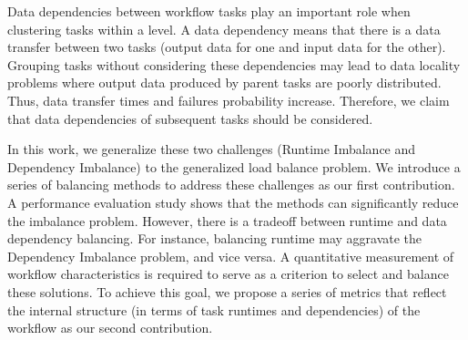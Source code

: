 \documentclass[final]{IEEEtran}
\begin{document}
Data dependencies between workflow tasks play an important role when clustering tasks within a level. A data dependency means that there is a data transfer between two tasks (output data for one and input data for the other). Grouping tasks without considering these dependencies may lead to data locality problems where output data produced by parent tasks are poorly distributed. Thus, data transfer times and failures probability increase.
Therefore, we claim that data dependencies of subsequent tasks should be considered.



In this work, we generalize these two challenges (Runtime Imbalance and Dependency Imbalance) to the generalized load balance problem. We introduce a series of balancing methods to address these challenges as our first contribution. A performance evaluation study shows that the methods can significantly reduce the imbalance problem.
However, there is a tradeoff between runtime and data dependency balancing. For instance, 
balancing runtime may aggravate the Dependency Imbalance problem, and vice versa. A quantitative measurement of workflow characteristics is required to serve as a criterion to select and balance these solutions. To achieve this goal, we propose a series of metrics that reflect the internal structure (in terms of task runtimes and dependencies) of the workflow as our second contribution. 
\end{document}
